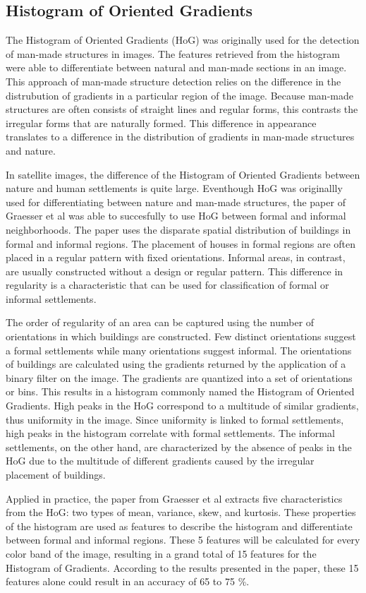 \subsection{Histogram of Oriented Gradients}


The Histogram of Oriented Gradients (HoG) was originally used for the detection of
man-made structures in images. The features retrieved from the histogram were
able to differentiate between natural and man-made sections in an image. This
approach of man-made structure detection relies on the difference in the
distrubution of gradients in a particular region of the image. Because man-made
structures are often consists of straight lines and regular forms, this
contrasts the irregular forms that are naturally formed. This difference in
appearance translates to a difference in the distribution of gradients in
man-made structures and nature.

In satellite images, the difference of the Histogram of Oriented Gradients
between nature and human settlements is quite large. Eventhough HoG was
originallly used for differentiating between nature and man-made structures,
the paper of Graesser et al was able to succesfully to use HoG between formal
and informal neighborhoods. The paper uses the disparate spatial distribution of
buildings in formal and informal regions. The
placement of houses in formal regions are often placed in a regular pattern
with fixed orientations. Informal areas, in contrast, are usually constructed
without a design or regular pattern. This difference in regularity is
a characteristic that can be used for classification of formal or informal
settlements.

The order of regularity of an area can be captured using the number of
orientations in which buildings are constructed. Few distinct orientations suggest
a formal settlements while many orientations suggest informal. The orientations
of buildings are calculated using the gradients returned by the application of
a binary filter on the image. The gradients are quantized into a set of
orientations or bins. This results in a histogram commonly named the Histogram
of Oriented Gradients. High peaks in the HoG correspond to a multitude of
similar gradients, thus uniformity in the image. Since uniformity is linked
to formal settlements, high peaks in the histogram correlate with formal
settlements. The informal settlements, on the other hand, are characterized by
the absence of peaks in the HoG due to the multitude of different gradients
caused by the irregular placement of buildings.

Applied in practice, the paper from Graesser et al extracts five
characteristics from the HoG: two types of mean, variance, skew, and
kurtosis. These properties of the histogram are used as features to
describe the histogram and differentiate between formal and informal regions.
These 5 features will be calculated for every color band of the image,
resulting in a grand total of 15 features for the Histogram of Gradients.
According to the results presented in the paper, these 15 features alone could
result in an accuracy of 65 to 75 \%.


